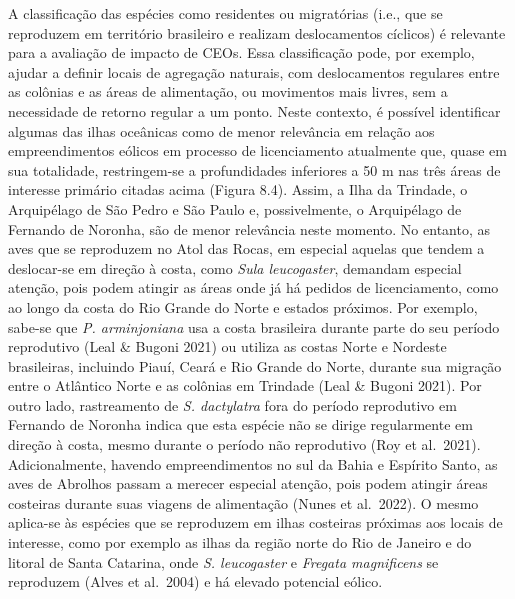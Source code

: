 \documentclass[
  oneside]{scrbook}
\begin{document}
A classificação das espécies como residentes ou migratórias (i.e., que se reproduzem em território brasileiro e realizam deslocamentos cíclicos) é relevante para a avaliação de impacto de CEOs. Essa classificação pode, por exemplo, ajudar a definir locais de agregação naturais, com deslocamentos regulares entre as colônias e as áreas de alimentação, ou movimentos mais livres, sem a necessidade de retorno regular a um ponto. Neste contexto, é possível identificar algumas das ilhas oceânicas como de menor relevância em relação aos empreendimentos eólicos em processo de licenciamento atualmente que, quase em sua totalidade, restringem-se a profundidades inferiores a 50 m nas três áreas de interesse primário citadas acima (Figura 8.4). Assim, a Ilha da Trindade, o Arquipélago de São Pedro e São Paulo e, possivelmente, o Arquipélago de Fernando de Noronha, são de menor relevância neste momento. No entanto, as aves que se reproduzem no Atol das Rocas, em especial aquelas que tendem a deslocar-se em direção à costa, como \emph{Sula leucogaster}, demandam especial atenção, pois podem atingir as áreas onde já há pedidos de licenciamento, como ao longo da costa do Rio Grande do Norte e estados próximos. Por exemplo, sabe-se que \emph{P. arminjoniana} usa a costa brasileira durante parte do seu período reprodutivo (Leal \& Bugoni 2021) ou utiliza as costas Norte e Nordeste brasileiras, incluindo Piauí, Ceará e Rio Grande do Norte, durante sua migração entre o Atlântico Norte e as colônias em Trindade (Leal \& Bugoni 2021). Por outro lado, rastreamento de \emph{S. dactylatra} fora do período reprodutivo em Fernando de Noronha indica que esta espécie não se dirige regularmente em direção à costa, mesmo durante o período não reprodutivo (Roy et al.~2021). Adicionalmente, havendo empreendimentos no sul da Bahia e Espírito Santo, as aves de Abrolhos passam a merecer especial atenção, pois podem atingir áreas costeiras durante suas viagens de alimentação (Nunes et al.~2022). O mesmo aplica-se às espécies que se reproduzem em ilhas costeiras próximas aos locais de interesse, como por exemplo as ilhas da região norte do Rio de Janeiro e do litoral de Santa Catarina, onde \emph{S. leucogaster} e \emph{Fregata magnificens} se reproduzem (Alves et al.~2004) e há elevado potencial eólico.
\end{document}
